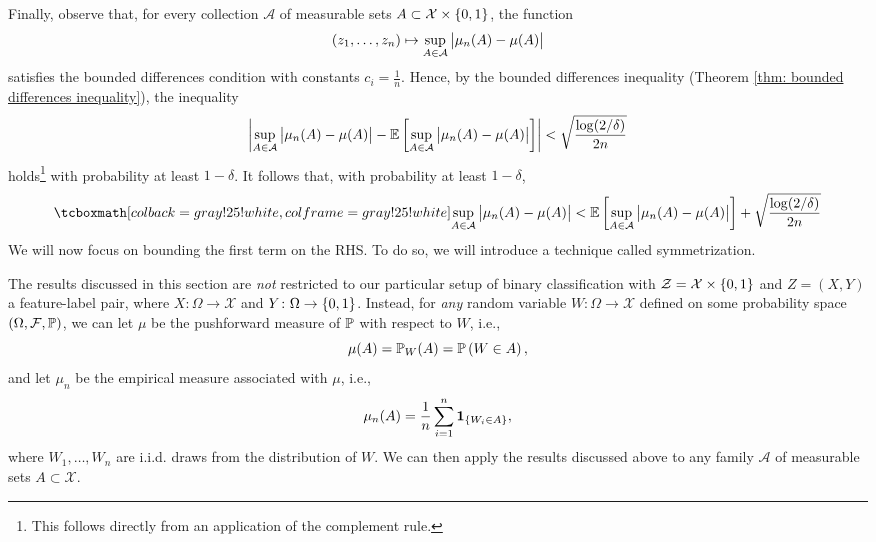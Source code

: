 Finally, observe that, for every collection $\mathcal{A}$ of measurable sets $A \subset \mathcal{X} \times \set{0, 1}$, the function
\[
    (z_1, \dots, z_n) \mapsto \sup_{A \in \mathcal{A}} \bigAbs{ \mu_n(A) - \mu(A) }
\]
satisfies the bounded differences condition with constants $c_i = \frac{1}{n}$. Hence, by the bounded differences inequality (Theorem \ref{thm: bounded differences inequality}), the inequality
\[
    \abs{ \sup_{A \in \mathcal{A}} \bigAbs{ \mu_n(A) - \mu(A) } - \Ex{\sup_{A \in \mathcal{A}} \bigAbs{ \mu_n(A) - \mu(A) }} } < \sqrt{\frac{\log(2 / \delta)}{2n}}
\]
holds\footnote{This follows directly from an application of the complement rule.} with probability at least $1 - \delta$. It follows that, with probability at least $1 - \delta$,
\begin{equation}
\label{eq: upper bound on uniform deviations}
    \highlightMath{
        \sup_{A \in \mathcal{A}} \bigAbs{ \mu_n(A) - \mu(A) } < \Ex{\sup_{A \in \mathcal{A}} \bigAbs{ \mu_n(A) - \mu(A) }} + \sqrt{\frac{\log(2 / \delta)}{2n}}
    }
\end{equation}
We will now focus on bounding the first term on the RHS. To do so, we will introduce a technique called symmetrization.

\begin{remark}
The results discussed in this section are \emph{not} restricted to our particular setup of binary classification with $\mathcal{Z} = \mathcal{X} \times \set{0, 1}$ and $Z = (X, Y)$ a feature-label pair, where $X \colon \Omega \to \mathcal{X}$ and $Y \colon \Omega \to \set{0 ,1}$. Instead, for \emph{any} random variable $W \colon \Omega \to \mathcal{X}$ defined on some probability space $(\Omega, \mathcal{F}, \P)$, we can let $\mu$ be the pushforward measure of $\P$ with respect to $W$, i.e.,
\[
    \mu(A) = \P_W(A) = \Pr{W \in A},
\]
and let $\mu_n$ be the empirical measure associated with $\mu$, i.e.,
\[
    \mu_n(A) = \frac{1}{n} \sum_{i=1}^n \indSet{W_i \in A},
\]
where $W_1, \dots, W_n$ are i.i.d. draws from the distribution of $W$. We can then apply the results discussed above to any family $\mathcal{A}$ of measurable sets $A \subset \mathcal{X}$.
\end{remark}
